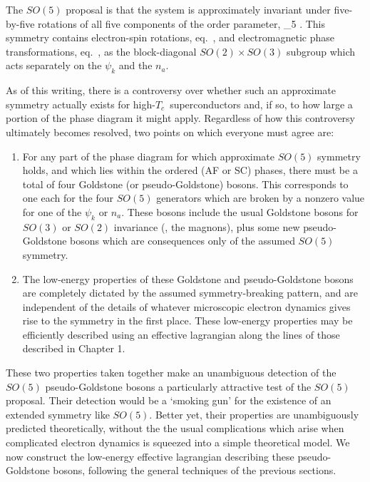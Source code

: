 \documentclass[12pt]{report}
\def\Tc{$T_c$}
\begin{document}
The $SO(5)$ proposal is that the system is approximately
invariant under five-by-five rotations of all five 
components of the order parameter,
%
\eq
\label{sofivedef}
 \to \Sco_5
\;  .
\eeq
%
This symmetry contains electron-spin rotations, 
eq.~, and electromagnetic phase
transformations, eq.~, as the
block-diagonal  $SO(2) \times SO(3)$ subgroup which acts
separately on the $\psi_k$ and the $n_a$.

As of this writing, there is a controversy over whether
such an approximate symmetry actually exists for  high-\Tc\
superconductors and, if so, to how large a  portion of the
phase diagram  it might apply. Regardless of how this
controversy ultimately becomes resolved,  two points on
which everyone must agree are:
%
\begin{enumerate}
\item
For any part of the phase diagram for which approximate
$SO(5)$ symmetry holds, and which lies within the ordered
(AF or SC) phases, there must be a total of four Goldstone
(or pseudo-Goldstone) bosons. This corresponds to one each
for the four $SO(5)$ generators which are broken by a
nonzero value for one of the $\psi_k$ or $n_a$. These
bosons include the usual Goldstone bosons for $SO(3)$ or
$SO(2)$ invariance (\eg, the magnons), plus some new
pseudo-Goldstone bosons which are consequences only of the
assumed $SO(5)$ symmetry.

\item
The low-energy properties of these Goldstone  and
pseudo-Goldstone bosons are completely dictated by the
assumed symmetry-breaking pattern, and  are independent of
the details of whatever microscopic electron dynamics gives
rise to the symmetry in the first place. These low-energy
properties may be efficiently described using an effective
lagrangian along the lines of those described in  Chapter 1.
%
\end{enumerate}
%
These two properties taken together make an unambiguous
detection of the $SO(5)$ pseudo-Goldstone bosons a
particularly attractive test of the $SO(5)$ proposal. Their
detection would be a `smoking gun' for the existence of an 
extended symmetry like $SO(5)$. Better yet, their
properties are unambiguously predicted theoretically,
without the  the usual complications which arise when
complicated electron dynamics is squeezed into a simple
theoretical model. We now construct the low-energy
effective lagrangian describing these pseudo-Goldstone
bosons, following the general techniques of the previous
sections.
\end{document}
